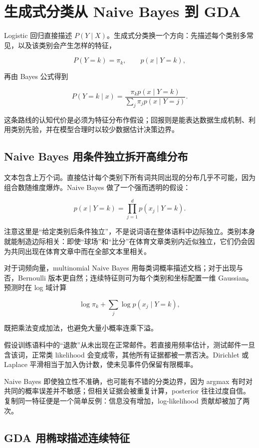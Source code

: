 \section{生成式分类从 Naive Bayes 到 GDA}

Logistic 回归直接描述 \(P(Y\mid X)\)。生成式分类换一个方向：先描述每个类别多常见，以及该类别会产生怎样的特征，

\[
P(Y=k)=\pi_k,\qquad p(x\mid Y=k),
\]

再由 Bayes 公式得到

\[
P(Y=k\mid x)
=\frac{\pi_kp(x\mid Y=k)}
{\sum_j\pi_jp(x\mid Y=j)}.
\]

这条路线的认知代价是必须为特征分布作假设；回报则是能表达数据生成机制、利用类别先验，并在模型合理时以较少数据估计决策边界。

\subsection{Naive Bayes 用条件独立拆开高维分布}

文本包含上万个词。直接估计每个类别下所有词共同出现的分布几乎不可能，因为组合数随维度爆炸。Naive Bayes 做了一个强而透明的假设：

\[
p(x\mid Y=k)=\prod_{j=1}^dp(x_j\mid Y=k).
\]

注意这里是``给定类别后条件独立''，不是说词语在整体语料中边际独立。类别本身就能制造边际相关：即使``球场''和``比分''在体育文章类别内近似独立，它们仍会因为共同出现在体育文章中而在全部文本里相关。

对于词频向量，multinomial Naive Bayes 用每类词概率描述文档；对于出现与否，Bernoulli 版本更自然；连续特征则可为每个类别和坐标配置一维 Gaussian。预测时在 log 域计算

\[
\log\pi_k+\sum_j\log p(x_j\mid Y=k),
\]

既把乘法变成加法，也避免大量小概率连乘下溢。

假设训练语料中的``退款''从未出现在正常邮件。若直接用频率估计，测试邮件一旦含该词，正常类 likelihood 会变成零，其他所有证据都被一票否决。Dirichlet 或 Laplace 平滑相当于加入伪计数，使未见事件仍保留有限概率。

Naive Bayes 即使独立性不准确，也可能有不错的分类边界，因为 argmax 有时对共同的概率误差并不敏感；但相关证据会被重复计算，posterior 往往过度自信。复制同一特征便是一个简单反例：信息没有增加，log-likelihood 贡献却被加了两次。

\subsection{GDA 用椭球描述连续特征}

